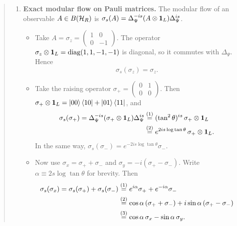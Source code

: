 \begin{quote}
\begin{enumerate}
\item \textbf{Exact modular flow on Pauli matrices.} The modular flow of an observable $A \in B(\mathcal{H}_R)$ is
$\sigma_s(A) = \Delta_\Psi^{-is} (A\otimes\mathbf{1}_L) \Delta_\Psi^{is}$.
\begin{itemize}
\item Take $A = \sigma_z = \begin{pmatrix} 1 & 0 \\ 0 & -1 \end{pmatrix}$. The operator
$\sigma_z \otimes \mathbf{1}_L = \operatorname{diag}(1, 1, -1, -1)$ is diagonal, so it commutes with $\Delta_\Psi$.
Hence
\[
\sigma_s(\sigma_z) = \sigma_z .
\]
\item Take the raising operator $\sigma_+ = \begin{pmatrix} 0 & 1 \\ 0 & 0 \end{pmatrix}$. Then
$\sigma_+ \otimes \mathbf{1}_L = \ket{00}\bra{10} + \ket{01}\bra{11}$, and
\begin{align}
\sigma_s(\sigma_+) = \Delta_\Psi^{-is} (\sigma_+\otimes\mathbf{1}_L) \Delta_\Psi^{is}
&\overset{(1)}{=} (\tan^2\theta)^{is}\, \sigma_+\otimes\mathbf{1}_L \notag\\
&\overset{(2)}{=} e^{2is\log\tan\theta}\, \sigma_+\otimes\mathbf{1}_L . \notag
\end{align}
\quad
{}
In the same way, $\sigma_s(\sigma_-) = e^{-2is\log\tan\theta} \sigma_-$.
\item Now use $\sigma_x = \sigma_+ + \sigma_-$ and $\sigma_y = -i(\sigma_+ - \sigma_-)$. Write
$\alpha\equiv2s\log\tan\theta$ for brevity. Then
\begin{align}
\sigma_s(\sigma_x) = \sigma_s(\sigma_+)+\sigma_s(\sigma_-)
&\overset{(1)}{=} e^{i\alpha}\sigma_+ + e^{-i\alpha}\sigma_- \notag\\
&\overset{(2)}{=} \cos\alpha\,(\sigma_++\sigma_-) + i\sin\alpha\,(\sigma_+-\sigma_-) \notag\\
&\overset{(3)}{=} \cos\alpha\,\sigma_x - \sin\alpha\,\sigma_y . \notag
\end{align}
\quad
{}\quad
{}


\end{itemize}
\end{enumerate}
\end{quote}

